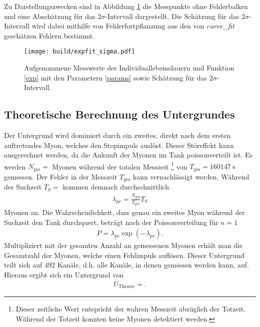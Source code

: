 Zu Darstellungszwecken sind in Abbildung \ref{plot:punkte_sigma} die Messpunkte ohne Fehlerbalken und eine Abschätzung für das $2\sigma$-Intervall dargestellt.
Die Schätzung für das $2\sigma$-Intervall wird dabei mithilfe von Fehlerfortpflanzung aus den von \emph{curve\_fit} geschätzen Fehlern bestimmt.

\begin{figure}
  \centering
  \texttt{[image: build/expfit\_sigma.pdf]}
  \caption{Aufgenommene Messwerte der Individuallebensdauern und Funktion \eqref{exp} mit den Parametern \eqref{params} sowie Schätzung für das $2\sigma$-Intervall.}
  \label{plot:punkte_sigma}
\end{figure}

\subsection{Theoretische Berechnung des Untergrundes}

Der Untergrund wird dominiert durch ein zweites, direkt nach dem ersten auftretendes Myon, welches den Stopimpuls auslöst.
Dieser Störeffekt kann ausgerechnet werden, da die Ankunft der Myonen im Tank poissonverteilt ist.
Es werden $N_\text{ges} = $ Myonen während der totalen Messzeit \footnote{Dieser zeitliche Wert entspricht der wahren Messzeit abzüglich der Totzeit. Während der Totzeit konnten keine Myonen detektiert werden.} von $T_\text{ges} = \SI{160147}{\second}$ gemessen.
Der Fehler in der Messzeit $T_\text{ges}$ kann vernachlässigt werden.
Während der Suchzeit $T_\text{S} = $ kommen demnach durchschnittlich
\begin{align*}
  \lambda_{pv} = \frac{N_\text{ges}}{T_\text{ges}} T_\text{S}
\end{align*}
Myonen an.
Die Wahrscheinlichkeit, dass genau ein zweites Myon während der Suchzeit den Tank durchquert, beträgt nach der Poissonverteilung für $n=1$
\begin{align*}
  P = \lambda_{pv} \exp{\left(-\lambda_{pv}\right)}.
\end{align*}
Multipliziert mit der gesamten Anzahl an gemessenen Myonen erhält man die Gesamtzahl der Myonen, welche einen Fehlimpuls auflösen.
Dieser Untergrund teilt sich auf $\num{492}$ Kanäle, d.h. alle Kanäle, in denen gemessen werden kann, auf.
Hieraus ergibt sich ein Untergrund von
\begin{align*}
  U_{\text{Theorie}} = .
\end{align*}

